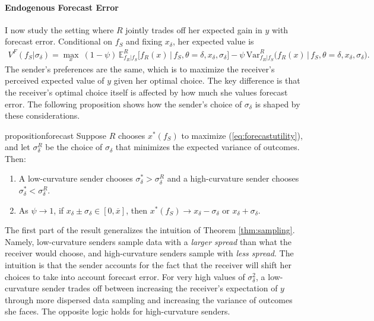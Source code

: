\documentclass[11pt,dvipsnames]{article}
\newcommand{\Var}{\mathrm{Var}}
\begin{document}
\paragraph{Endogenous Forecast Error}
I now study the setting where $R$ jointly trades off her expected gain in $y$ with forecast error. 
Conditional on $f_S$ and fixing $x_\delta$, her expected value is
\begin{align*}
V^F(f_S|\sigma_\delta)
= \max_{x}\ (1-\psi)\,\mathbb{E}_{f_R|f_S}^R\big[f_R(x)\,\big|\,f_S,\theta=\delta,x_\delta,\sigma_\delta\big]
-\psi\,\Var_{f_R|f_S}^R\big(f_R(x)\,\big|\,f_S,\theta=\delta,x_\delta,\sigma_\delta\big).
\end{align*}
The sender's preferences are the same, which is to maximize the receiver's perceived expected value of $y$ given her optimal choice.
The key difference is that the receiver's optimal choice itself is affected by how much she values forecast error.
The following proposition shows how the sender's choice of $\sigma_\delta$ is shaped by these considerations.
\begin{restatable}{proposition}{forecast}
Suppose $R$ chooses $x^*(f_S)$ to maximize (\ref{eq:forecastutility}), and let $\sigma_\delta^R$ be the choice of $\sigma_\delta$ that minimizes the expected variance of outcomes.
Then:
\begin{enumerate}
\item A low-curvature sender chooses $\sigma_\delta^* > \sigma_{\delta}^R$ and a high-curvature sender chooses $\sigma_\delta^* < \sigma_{\delta}^R$.
\item As $\psi \to 1$, if $x_\delta\pm\sigma_\delta\in[0,\overline{x}]$, then $x^*(f_S) \to x_\delta - \sigma_\delta$ or $x_\delta + \sigma_\delta$.
\end{enumerate}
\label{prop:forecast}
\end{restatable}
The first part of the result generalizes the intuition of Theorem \ref{thm:sampling}.
Namely, low-curvature senders sample data with a \emph{larger spread} than what the receiver would choose, and high-curvature senders sample with \emph{less spread}.
The intuition is that the sender accounts for the fact that the receiver will shift her choices to take into account forecast error.
For very high values of $\sigma_\delta^2$, a low-curvature sender trades off between increasing the receiver's expectation of $y$ through more dispersed data sampling and increasing the variance of outcomes she faces.
The opposite logic holds for high-curvature senders.
\end{document}
